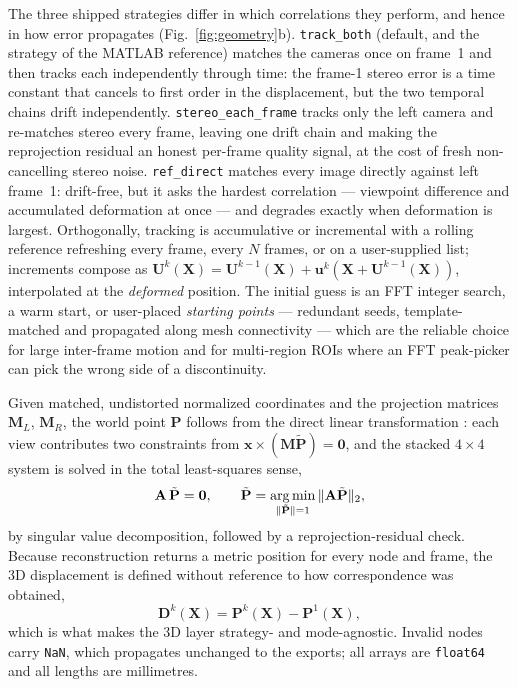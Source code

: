 The three shipped strategies differ in which correlations they perform, and hence in how error propagates (Fig.~\ref{fig:geometry}b). \texttt{track\_both} (default, and the strategy of the MATLAB reference) matches the cameras once on frame~1 and then tracks each independently through time: the frame-1 stereo error is a time constant that cancels to first order in the displacement, but the two temporal chains drift independently. \texttt{stereo\_each\_frame} tracks only the left camera and re-matches stereo every frame, leaving one drift chain and making the reprojection residual an honest per-frame quality signal, at the cost of fresh non-cancelling stereo noise. \texttt{ref\_direct} matches every image directly against left frame~1: drift-free, but it asks the hardest correlation --- viewpoint difference and accumulated deformation at once --- and degrades exactly when deformation is largest. Orthogonally, tracking is accumulative or incremental with a rolling reference refreshing every frame, every $N$ frames, or on a user-supplied list; increments compose as $\mathbf{U}^{k}(\mathbf{X}) = \mathbf{U}^{k-1}(\mathbf{X}) + \mathbf{u}^{k}(\mathbf{X}+\mathbf{U}^{k-1}(\mathbf{X}))$, interpolated at the \emph{deformed} position. The initial guess is an FFT integer search, a warm start, or user-placed \emph{starting points} --- redundant seeds, template-matched and propagated along mesh connectivity --- which are the reliable choice for large inter-frame motion and for multi-region ROIs where an FFT peak-picker can pick the wrong side of a discontinuity.

Given matched, undistorted normalized coordinates and the projection matrices $\mathbf{M}_L$, $\mathbf{M}_R$, the world point $\mathbf{P}$ follows from the direct linear transformation \cite{abdelaziz2015dlt}: each view contributes two constraints from $\mathbf{x}\times(\mathbf{M}\tilde{\mathbf{P}})=\mathbf{0}$, and the stacked $4\times4$ system is solved in the total least-squares sense,
%
\begin{equation}
\mathbf{A}\,\tilde{\mathbf{P}} = \mathbf{0},
\qquad
\tilde{\mathbf{P}} = \operatorname*{arg\,min}_{\|\tilde{\mathbf{P}}\|=1} \|\mathbf{A}\tilde{\mathbf{P}}\|_2 ,
\label{eq:dlt}
\end{equation}
%
by singular value decomposition, followed by a reprojection-residual check. Because reconstruction returns a metric position for every node and frame, the 3D displacement is defined without reference to how correspondence was obtained,
%
\begin{equation}
\mathbf{D}^{k}(\mathbf{X}) = \mathbf{P}^{k}(\mathbf{X}) - \mathbf{P}^{1}(\mathbf{X}),
\label{eq:disp}
\end{equation}
%
which is what makes the 3D layer strategy- and mode-agnostic. Invalid nodes carry \texttt{NaN}, which propagates unchanged to the exports; all arrays are \texttt{float64} and all lengths are millimetres.


